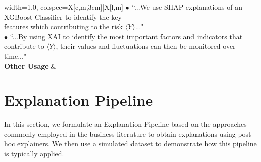 \documentclass[mnsc,blindrev]{informs3}
\begin{document}
\begin{table}[htbp]
\begin{tblr}{width=1.0\textwidth, colspec={X[c,m,3cm]|X[l,m]}}
{$\bullet$ ``...We use SHAP explanations of an XGBoost Classifier to identify the key \\features which contributing to the risk $\langle Y\rangle$..."\\
$\bullet$ ``...By using XAI to identify the most important factors and indicators that \\contribute to $\langle Y\rangle$, their values and fluctuations can then be monitored over time..."} \\ \hline
  \textbf{Other Usage}
 &  \\
\end{tblr}

\label{tab:metric_examples}
\end{table}



\section{Explanation Pipeline}
    \label{sec:pipeline_demo}
In this section, we formulate an Explanation Pipeline based on the approaches commonly employed in the business literature to obtain explanations using post hoc explainers. We then use a simulated dataset to demonstrate how this pipeline is typically applied.
    
\end{document}
